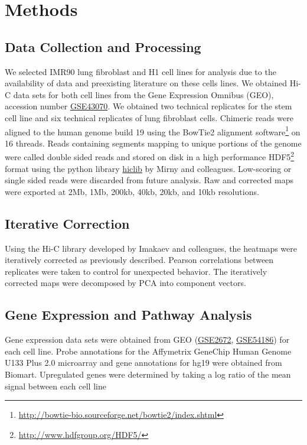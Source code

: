 \chapter{Methods}

\section*{Data Collection and Processing}

We selected IMR90 lung fibroblast and H1  cell lines for analysis due to the availability of data and
preexisting literature on these cells lines.  We obtained Hi-C data sets for both cell lines from the Gene Expression Omnibus
(GEO)\cite{edgar2002}, accession number \href{http://www.ncbi.nlm.nih.gov/geo/query/acc.cgi?acc=GSE43070}{GSE43070}.  We obtained
two technical replicates for the stem cell line and six technical replicates of lung fibroblast cells.  Chimeric reads were
aligned to the human genome build 19 using the BowTie2 alignment
software\footnote{\url{http://bowtie-bio.sourceforge.net/bowtie2/index.shtml}} on 16 threads\cite{langmead2012}.  Reads containing
segments mapping to unique portions of the genome were called double sided reads and stored on disk in a high performance
HDF5\footnote{\url{http://www.hdfgroup.org/HDF5/}} format using the python library \href{https://bitbucket.org/mirnylab/hiclib}{hiclib}
by Mirny and colleagues\cite{imakaev2012}.  Low-scoring or single sided reads were discarded from future analysis.  Raw and
corrected maps were exported at 2Mb, 1Mb, 200kb, 40kb, 20kb, and 10kb resolutions.

\section*{Iterative Correction}

Using the Hi-C library developed by Imakaev and colleagues, the heatmaps were iteratively corrected as previously
described\cite{imakaev2012}.  Pearson correlations between replicates were taken to control for unexpected behavior.
The iteratively corrected maps were decomposed by \gls{PCA} into component vectors.

\section*{Gene Expression and Pathway Analysis}

Gene expression data sets were obtained from \gls{GEO} (\href{http://www.ncbi.nlm.nih.gov/geo/query/acc.cgi?acc=GSE2672}{GSE2672},
\href{http://www.ncbi.nlm.nih.gov/geo/query/acc.cgi?acc=GSE54186}{GSE54186}) for each cell line\cite{kim2005}\cite{kim2014}.  Probe
annotations for the Affymetrix GeneChip Human Genome U133 Plus 2.0 microarray and gene annotations for hg19 were obtained from
Biomart\cite{kasprzyk2011}.  Upregulated genes were determined by taking a log ratio of the mean signal between each cell line

